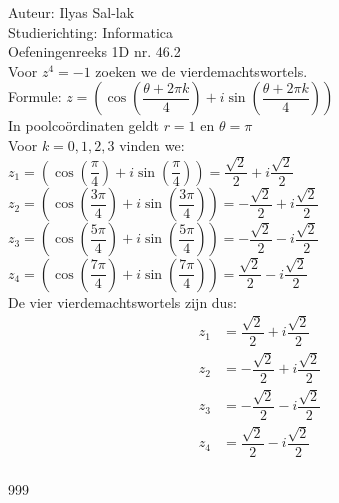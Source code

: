 \documentclass[a4paper]{article}
\begin{document}
	
	\noindent \large Auteur: Ilyas Sal-lak \\
	
	\noindent \large Studierichting: Informatica\\
	
	\noindent \large Oefeningenreeks 1D nr. 46.2\\
	
	\medskip
	\normalsize
	Voor $z^4 = -1$ zoeken we de vierdemachtswortels.\\
	
	Formule: $z = \left(\cos\left(\dfrac{\theta + 2\pi k}{4}\right) + i\sin\left(\dfrac{\theta + 2\pi k}{4}\right)\right)$\\
	
	In poolcoördinaten geldt $r = 1$ en $\theta = \pi$\\
	
	Voor $k = 0, 1, 2, 3$ vinden we:\\
	
	$z_1 = \left(\cos\left(\dfrac{\pi}{4}\right) + i\sin\left(\dfrac{\pi}{4}\right)\right) = \dfrac{\sqrt{2}}{2} + i\dfrac{\sqrt{2}}{2}$\\
	
	$z_2 = \left(\cos\left(\dfrac{3\pi}{4}\right) + i\sin\left(\dfrac{3\pi}{4}\right)\right) = -\dfrac{\sqrt{2}}{2} + i\dfrac{\sqrt{2}}{2}$\\
	
	$z_3 = \left(\cos\left(\dfrac{5\pi}{4}\right) + i\sin\left(\dfrac{5\pi}{4}\right)\right) = -\dfrac{\sqrt{2}}{2} - i\dfrac{\sqrt{2}}{2}$\\
	
	$z_4 = \left(\cos\left(\dfrac{7\pi}{4}\right) + i\sin\left(\dfrac{7\pi}{4}\right)\right) = \dfrac{\sqrt{2}}{2} - i\dfrac{\sqrt{2}}{2}$\\
	
	De vier vierdemachtswortels zijn dus:\\
	\begin{align*}
		z_1 &= \dfrac{\sqrt{2}}{2} + i\dfrac{\sqrt{2}}{2} \\
		z_2 &= -\dfrac{\sqrt{2}}{2} + i\dfrac{\sqrt{2}}{2} \\
		z_3 &= -\dfrac{\sqrt{2}}{2} - i\dfrac{\sqrt{2}}{2} \\
		z_4 &= \dfrac{\sqrt{2}}{2} - i\dfrac{\sqrt{2}}{2} \\
	\end{align*}
	
	\begin{thebibliography}{999}
	\end{thebibliography}
\end{document}
